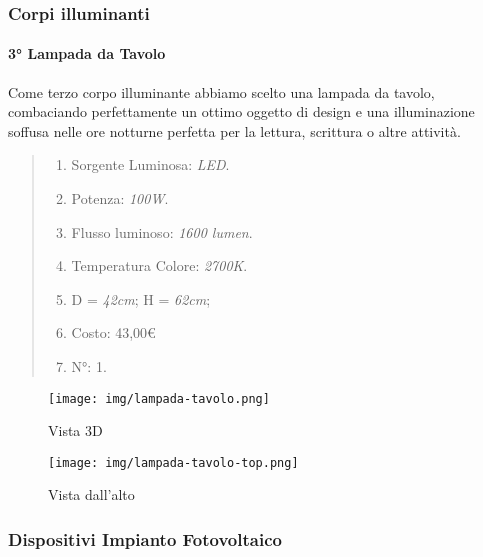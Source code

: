 \documentclass[italian, 12pt, a4paper]{article}
\begin{document}
\subsubsection{Corpi illuminanti}
\paragraph{3° Lampada da Tavolo}
Come terzo corpo illuminante abbiamo scelto una lampada da tavolo, combaciando perfettamente un ottimo oggetto di design e una illuminazione soffusa nelle ore notturne perfetta per la lettura, scrittura o altre attività.
\begin{quote}
    \begin{enumerate}
        \item Sorgente Luminosa: \emph{LED}.
        \item Potenza: \emph{100W}.
        \item Flusso luminoso: \emph{1600 lumen}.
        \item Temperatura Colore: \emph{2700K}.
        \item D = \emph{42cm}; H = \emph{62cm};
        \item Costo: 43,00€
        \item N°: 1.
    \end{enumerate}
\end{quote}
\begin{figure}[h]
    \centering
    \begin{minipage}{0.45\textwidth}
        \centering
        \texttt{[image: img/lampada-tavolo.png]} %
        \caption{Vista 3D}
    \end{minipage} \hfill
    \begin{minipage}{0.45\textwidth}
        \centering
        \texttt{[image: img/lampada-tavolo-top.png]} %
        \caption{Vista dall'alto}
    \end{minipage}
\end{figure}
\clearpage
\subsubsection{Dispositivi Impianto Fotovoltaico}
\end{document}
